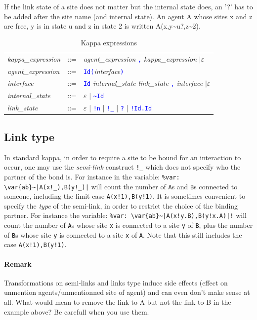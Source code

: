 \documentclass[11pt]{book}
\def\intstate{\textasciitilde}
\def\tcb#1{\textcolor{blue}{\ttt{#1}}}
\def\ttt#1{\texttt{#1}}
\def\var#1{{\textquotesingle}#1{\textquotesingle}}
\newcommand{\Remark}{\paragraph{Remark}}
\begin{document}
If the link state of a site does not matter but the internal state
does, an '?' has to be added after the site name (and internal state).
An agent A whose sites x and z are free, y is in state u and z in
state 2 is written A(x,y\intstate{}u?,z\intstate{}2).

\begin{table}[ht!]
  \centering
  \caption{Kappa expressions}
  \begin{tabular}{@{} lcl @{}}
    \textit{kappa\_expression} & ::= & \textit{agent\_expression} \tcb{,} \textit{kappa\_expression} $\mid\varepsilon$ \\
    \textit{agent\_expression} & ::= &  \tcb{Id}\tcb{(}\textit{interface}\tcb{)} \\
    \textit{interface} &::=& \tcb{Id} \textit{internal\_state link\_state}  \tcb{,} \textit{interface} $\mid\varepsilon$ \\
    \textit{internal\_state} &::=& $\varepsilon$ | \tcb{\intstate Id} \\
    \textit{link\_state} &::=& $\varepsilon$ | \tcb{!n} | \tcb{!\_} | \tcb{?}  | \tcb{!Id.Id} \\
    \end{tabular}
  \label{tab:patterns}
\end{table}

\subsection{Link type}

In standard kappa, in order to require a site to be bound for an
interaction to occur, one may use the
\emph{semi-link} construct \ttt{!\_} which does not
specify who the partner of the bond is. For instance in the variable:
\lstinline[language=kappa]*%var: \var{ab}~|A(x!_),B(y!_)|* will
count the number of \ttt{A}s and \ttt{B}s connected to someone,
including the limit case \ttt{A(x!1),B(y!1)}. It is sometimes
convenient to specify the \emph{type} of the
semi-link, in order to restrict the choice of the binding partner. For
instance the variable:
\lstinline[language=kappa]*%var: \var{ab}~|A(x!y.B),B(y!x.A)|!*
will count the number of \ttt{A}s whose
site \ttt{x} is connected to a site \ttt{y} of \ttt{B}, plus the
number of \ttt{B}s whose site \ttt{y} is connected to a site \ttt{x}
of \ttt{A}. Note that this still includes the case
\ttt{A(x!1),B(y!1)}.

\Remark{Transformations on semi-links and links type induce side
  effects (effect on unmention agents/unmentionned site of agent) and
  can even don't make sense at all. What would mean to remove the link
  to A but not the link to B in the example above? Be carefull when
  you use them.}
\end{document}
